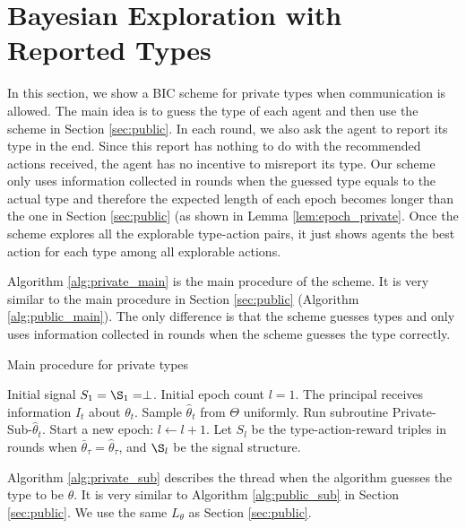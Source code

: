 
\section{Bayesian Exploration with Reported Types}
\label{sec:private_c}
In this section, we show a BIC scheme for private types when communication is allowed. The main idea is to guess the type of each agent and then use the scheme in Section \ref{sec:public}. In each round, we also ask the agent to report its type in the end. Since this report has nothing to do with the recommended actions received, the agent has no incentive to misreport its type. Our scheme only uses information collected in rounds when the guessed type equals to the actual type and therefore the expected length of each epoch becomes longer than the one in Section \ref{sec:public} (as shown in Lemma \ref{lem:epoch_private}. Once the scheme explores all the explorable type-action pairs, it just shows agents the best action for each type among all explorable actions. 

Algorithm \ref{alg:private_main} is the main procedure of the scheme. It is very similar to the main procedure in Section \ref{sec:public} (Algorithm \ref{alg:public_main}). The only difference is that the scheme guesses types and only uses information collected in rounds when the scheme guesses the type correctly. 

 \begin{algorithm}[H]
    \caption{Main procedure for private types }
    	\label{alg:private_main}
    \begin{algorithmic}[1]
    	\STATE Initial signal $S_1 = \S_1 = \perp$.
	\STATE Initial epoch count $l = 1$. 
		\STATE The principal receives information $I_t$ about $\theta_t$. 
		\STATE Sample $\hat{\theta}_t$ from $\varTheta$ uniformly. Run subroutine Private-Sub-$\hat{\theta}_t$.
			\STATE Start a new epoch:
			\STATE $l \leftarrow l + 1$.
			\STATE Let $S_l$ be the type-action-reward triples in rounds when $\bar{\theta}_{\tau} = \hat{\theta}_{\tau}$, and $\S_l$ be the signal structure.
		\ENDIF
	\ENDFOR
     \end{algorithmic}
\end{algorithm}

Algorithm \ref{alg:private_sub} describes the thread when the algorithm guesses the type to be $\theta$. It is very similar to Algorithm \ref{alg:public_sub} in Section \ref{sec:public}. We use the same $L_{\theta}$ as Section \ref{sec:public}.

